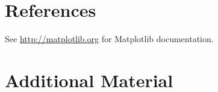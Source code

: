 \section*{References}

See \url{http://matplotlib.org} for Matplotlib documentation.

\newpage

\section*{Additional Material} %

